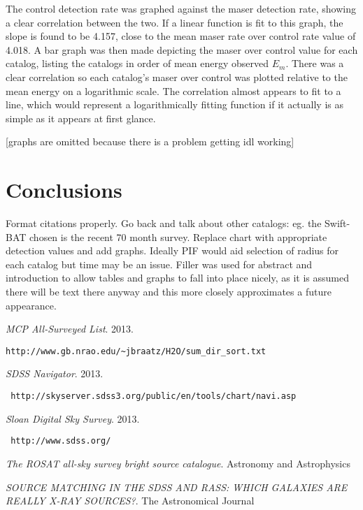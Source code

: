 \documentclass[10pt]{article}
\begin{document}
\begin{multicols}{2}
The control detection rate was graphed against the maser detection rate, showing a clear correlation between the two. If a linear function is fit to this graph, the slope is found to be 4.157, close to the mean maser rate over control rate value of 4.018. A bar graph was then made depicting the maser over control value for each catalog, listing the catalogs in order of mean energy observed $E_m$. There was a clear correlation so each catalog's maser over control was plotted relative to the mean energy on a logarithmic scale. The correlation almost appears to fit to a line, which would represent a logarithmically fitting function if it actually is as simple as it appears at first glance.

[graphs are omitted because there is a problem getting idl working]

\section{Conclusions}\label{conclusion}
Format citations properly. Go back and talk about other catalogs: eg. the Swift-BAT chosen is the recent 70 month survey. Replace chart with appropriate detection values and add graphs. Ideally PIF would aid selection of radius for each catalog but time may be an issue. Filler was used for abstract and introduction to allow tables and graphs to fall into place nicely, as it is assumed there will be text there anyway and this more closely approximates a future appearance.
\end{multicols}


\begin{thebibliography}{1}
  \emph{MCP All-Surveyed List}.
  2013. \begin{verbatim}http://www.gb.nrao.edu/~jbraatz/H2O/sum_dir_sort.txt\end{verbatim} 
  
  \emph{SDSS Navigator}.
  2013. \begin{verbatim} http://skyserver.sdss3.org/public/en/tools/chart/navi.asp\end{verbatim} 

  \emph{Sloan Digital Sky Survey}.
  2013. \begin{verbatim} http://www.sdss.org/\end{verbatim} 
  
  \emph{The ROSAT all-sky survey bright source catalogue}.
  Astronomy and Astrophysics
  
  \emph{SOURCE MATCHING IN THE SDSS AND RASS: WHICH GALAXIES ARE REALLY X-RAY SOURCES?}.
  The Astronomical Journal
  
  
\end{thebibliography}
\end{document}
